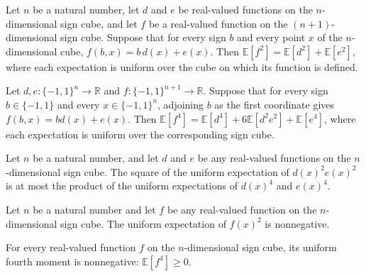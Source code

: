 \begin{theorem}
\label{FABL.expect_sq_eq_expect_odd_even}
\leanok
{}
Let $n$ be a natural number, let $d$ and $e$ be real-valued functions on the
$n$-dimensional sign cube, and let $f$ be a real-valued function on the
$(n+1)$-dimensional sign cube. Suppose that for every sign $b$ and every point $x$ of
the $n$-dimensional cube, $f(b,x)=b\,d(x)+e(x)$. Then
$\mathbb{E}[f^2]=\mathbb{E}[d^2]+\mathbb{E}[e^2]$, where each expectation is uniform
over the cube on which its function is defined.
\end{theorem}

\begin{theorem}
\label{FABL.expect_fourth_eq_expect_odd_even}
\leanok
{}
Let $d,e:\{-1,1\}^n\to\mathbb R$ and $f:\{-1,1\}^{n+1}\to\mathbb R$. Suppose
that for every sign $b\in\{-1,1\}$ and every $x\in\{-1,1\}^n$, adjoining $b$ as
the first coordinate gives $f(b,x)=b d(x)+e(x)$. Then $\mathbb E[f^4]=\mathbb
E[d^4]+6\mathbb E[d^2e^2]+\mathbb E[e^4]$, where each expectation is uniform over the
corresponding sign cube.
\end{theorem}

\begin{theorem}
\label{FABL.expect_sq_mul_sq_sq_le}
\leanok
{}
Let $n$ be a natural number, and let $d$ and $e$ be any real-valued functions on the
$n$-dimensional sign cube. The square of the uniform expectation of $d(x)^2e(x)^2$ is at
most the product of the uniform expectations of $d(x)^4$ and $e(x)^4$.
\end{theorem}

\begin{theorem}
\label{FABL.expect_sq_nonneg}
\leanok
{}
Let $n$ be a natural number and let $f$ be any real-valued function on the
$n$-dimensional sign cube. The uniform expectation of $f(x)^2$ is nonnegative.
\end{theorem}

\begin{theorem}
\label{FABL.expect_fourth_nonneg}
\leanok
{}
For every real-valued function $f$ on the $n$-dimensional sign cube, its uniform fourth
moment is nonnegative: $\mathbb E[f^4]\ge 0$.
\end{theorem}

